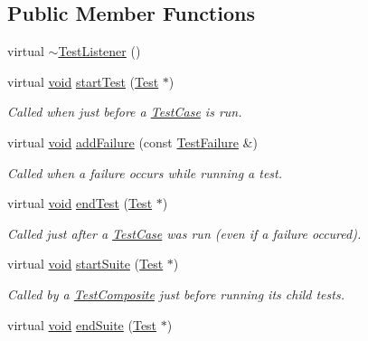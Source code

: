 \subsection*{Public Member Functions}
\begin{DoxyCompactItemize}
\item 
virtual \hyperlink{class_test_listener_ae59dec3ae673618185eebf71881902e9}{$\sim$\-Test\-Listener} ()
\item 
virtual \hyperlink{wglew_8h_aeea6e3dfae3acf232096f57d2d57f084}{void} \hyperlink{class_test_listener_a5546d4420e7412234915113b1ea5ad77}{start\-Test} (\hyperlink{class_test}{Test} $\ast$)
\begin{DoxyCompactList}\small\item\em Called when just before a \hyperlink{class_test_case}{Test\-Case} is run. \end{DoxyCompactList}\item 
virtual \hyperlink{wglew_8h_aeea6e3dfae3acf232096f57d2d57f084}{void} \hyperlink{class_test_listener_a103216a5814c907f7b752b969477e765}{add\-Failure} (const \hyperlink{class_test_failure}{Test\-Failure} \&)
\begin{DoxyCompactList}\small\item\em Called when a failure occurs while running a test. \end{DoxyCompactList}\item 
virtual \hyperlink{wglew_8h_aeea6e3dfae3acf232096f57d2d57f084}{void} \hyperlink{class_test_listener_ae8ccd0f55dd9aa7eafded05ba14f9ac6}{end\-Test} (\hyperlink{class_test}{Test} $\ast$)
\begin{DoxyCompactList}\small\item\em Called just after a \hyperlink{class_test_case}{Test\-Case} was run (even if a failure occured). \end{DoxyCompactList}\item 
virtual \hyperlink{wglew_8h_aeea6e3dfae3acf232096f57d2d57f084}{void} \hyperlink{class_test_listener_a2360ebfccfa39f75bdc43948d5d1d2e7}{start\-Suite} (\hyperlink{class_test}{Test} $\ast$)
\begin{DoxyCompactList}\small\item\em Called by a \hyperlink{class_test_composite}{Test\-Composite} just before running its child tests. \end{DoxyCompactList}\item 
virtual \hyperlink{wglew_8h_aeea6e3dfae3acf232096f57d2d57f084}{void} \hyperlink{class_test_listener_ad49e5589681732a1faff8fca5cbe61f5}{end\-Suite} (\hyperlink{class_test}{Test} $\ast$)

\end{DoxyCompactItemize}
